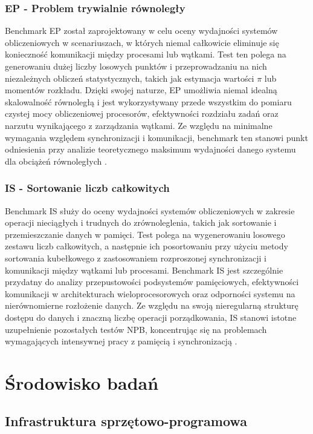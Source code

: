 \subsubsection{EP - Problem trywialnie równoległy}
Benchmark EP  został zaprojektowany w celu oceny wydajności systemów obliczeniowych w scenariuszach, w których niemal całkowicie eliminuje się konieczność komunikacji między procesami lub wątkami. Test ten polega na generowaniu dużej liczby losowych punktów i przeprowadzaniu na nich niezależnych obliczeń statystycznych, takich jak estymacja wartości $\pi$ lub momentów rozkładu. Dzięki swojej naturze, EP umożliwia niemal idealną skalowalność równoległą i jest wykorzystywany przede wszystkim do pomiaru czystej mocy obliczeniowej procesorów, efektywności rozdziału zadań oraz narzutu wynikającego z zarządzania wątkami. Ze względu na minimalne wymagania względem synchronizacji i komunikacji, benchmark ten stanowi punkt odniesienia przy analizie teoretycznego maksimum wydajności danego systemu dla obciążeń równoległych \cite{nasaParallelBenchmarks}.

\subsubsection{IS - Sortowanie liczb całkowitych}
Benchmark IS  służy do oceny wydajności systemów obliczeniowych w zakresie operacji nieciągłych i trudnych do zrównoleglenia, takich jak sortowanie i przemieszczanie danych w pamięci. Test polega na wygenerowaniu losowego zestawu liczb całkowitych, a następnie ich posortowaniu przy użyciu metody sortowania kubełkowego  z zastosowaniem rozproszonej synchronizacji i komunikacji między wątkami lub procesami. Benchmark IS jest szczególnie przydatny do analizy przepustowości podsystemów pamięciowych, efektywności komunikacji w architekturach wieloprocesorowych oraz odporności systemu na nierównomierne rozłożenie danych. Ze względu na swoją nieregularną strukturę dostępu do danych i znaczną liczbę operacji porządkowania, IS stanowi istotne uzupełnienie pozostałych testów NPB, koncentrując się na problemach wymagających intensywnej pracy z pamięcią i synchronizacją \cite{nasaParallelBenchmarks}.

\section{Środowisko badań}

\subsection{Infrastruktura sprzętowo-programowa}

